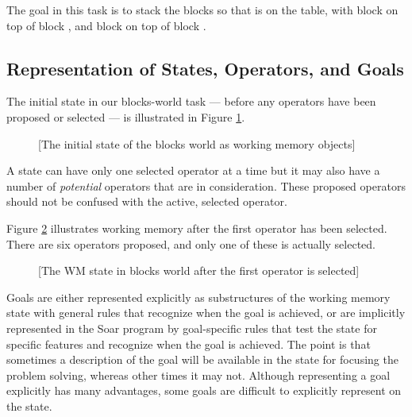 The goal in this task is to stack the blocks so that  is on the table, with block  on top of block , and block  on top of block .

\subsection{Representation of States, Operators, and Goals}
\label{OVERVIEW-ps-representation}

The initial state in our blocks-world task --- before any operators have been proposed or selected --- is illustrated in Figure \ref{fig:ab-wmem}.

\begin{figure}
	[The initial state of the blocks world as working memory objects]
	\label{fig:ab-wmem}
\end{figure}

A state can have only one selected operator at a time but it may also have a number of \emph{potential} operators that are in consideration. These proposed operators should not be confused with the active, selected operator.

Figure \ref{fig:ab-wmem2} illustrates working memory after the first operator has been selected. There are six operators proposed, and only one of these is actually selected.

\begin{figure}
	[The WM state in blocks world after the first operator is selected]
	\label{fig:ab-wmem2}
\end{figure}

Goals are either represented explicitly as substructures of the working memory state with general rules that recognize when the goal is achieved, or are implicitly represented in the Soar program by goal-specific rules that test the state for specific features and recognize when the goal is achieved.  The point is that sometimes a description of the goal will be available in the state for focusing the problem solving, whereas other times it may not.  Although representing a goal explicitly has many advantages, some goals are difficult to explicitly represent on the state.

